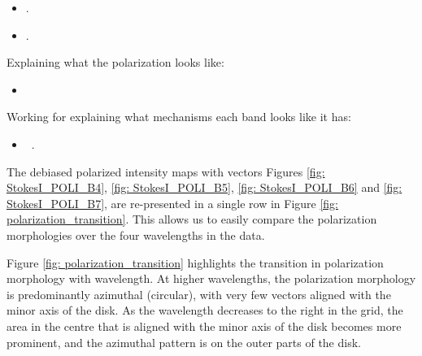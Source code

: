
\begin{itemize}
    \item {}. 
    \item {}. 
\end{itemize}


Explaining what the polarization looks like:
\begin{itemize}
    \item {} \citep{Kataoka_2017}
\end{itemize}



Working for explaining what mechanisms each band looks like it has:
\begin{itemize}
    \item\ .
\end{itemize}



The debiased polarized intensity maps with vectors Figures \ref{fig: StokesI_POLI_B4}, \ref{fig: StokesI_POLI_B5}, \ref{fig: StokesI_POLI_B6} and \ref{fig: StokesI_POLI_B7}, are re-presented in a single row in Figure \ref{fig: polarization_transition}. This allows us to easily compare the polarization morphologies over the four wavelengths in the data. 


Figure \ref{fig: polarization_transition} highlights the transition in polarization morphology with wavelength. At higher wavelengths, the polarization morphology is predominantly azimuthal (circular), with very few vectors aligned with the minor axis of the disk. As the wavelength decreases to the right in the grid, the area in the centre that is aligned with the minor axis of the disk becomes more prominent, and the azimuthal pattern is on the outer parts of the disk.  




